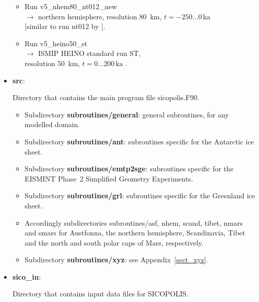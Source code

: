 \documentclass[12pt,a4paper]{article}
\begin{document}
\begin{itemize}
\begin{itemize}
\item
Run v5\_nhem80\_nt012\_new
\\
$\longrightarrow$ northern hemisphere, resolution 80~km, $t=-250\ldots{}0\,\mathrm{ka}$
\\
\phantom{$\longrightarrow$} [similar to run nt012 by \citet{greve_etal_1999a}].

\item
Run v5\_heino50\_st
\\
$\longrightarrow$ ISMIP HEINO standard run ST,
\\
\phantom{$\longrightarrow$} resolution 50~km, $t=0\ldots{}200\,\mathrm{ka}$ \citep{calov_etal_2010}.

\end{itemize}

\item \textbf{src}:

Directory that contains the main program file sicopolis.F90.

\begin{itemize}

\item
Subdirectory \textbf{subroutines/general}: general subroutines, for any modelled domain.

\item
Subdirectory \textbf{subroutines/ant}: subroutines specific for the Antarctic ice sheet.

\item
Subdirectory \textbf{subroutines/emtp2sge}: subroutines specific for the EISMINT Phase~2 Simplified Geometry Experiments.

\item
Subdirectory \textbf{subroutines/grl}: subroutines specific for the Greenland ice sheet.

\item
Accordingly subdirectories subroutines/asf, nhem, scand, tibet, nmars and smars for Austfonna, the northern hemisphere, Scandinavia, Tibet and the north and south polar caps of Mars, respectively.

\item
Subdirectory \textbf{subroutines/xyz}: see Appendix~\ref{sect_xyz}.

\end{itemize}

\item \textbf{sico\_in}:

Directory that contains input data files for SICOPOLIS.

\begin{itemize}


\end{itemize}
\end{itemize}
\end{document}
